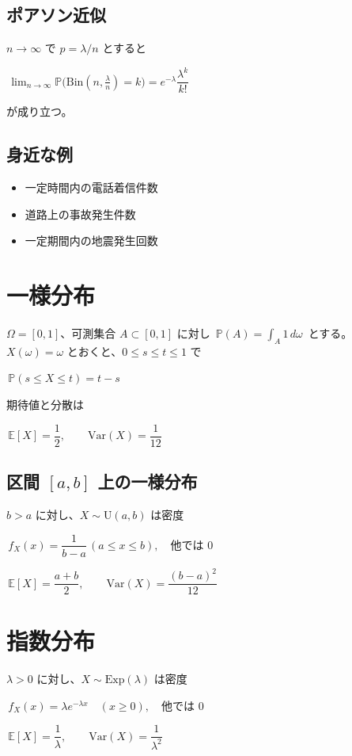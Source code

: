 \documentclass[uplatex,dvipdfmx,11pt,a4paper,openany]{bxjsbook}
\begin{document}
\subsection{ポアソン近似}
$n\to\infty$ で $p=\lambda/n$ とすると

$\,\displaystyle\lim_{n\to\infty}\mathbb{P}\bigl(\mathrm{Bin}(n,\tfrac{\lambda}{n})=k\bigr)=e^{-\lambda}\dfrac{\lambda^k}{k!}\,$

が成り立つ。

\subsection{身近な例}
\begin{itemize}
\item 一定時間内の電話着信件数
\item 道路上の事故発生件数
\item 一定期間内の地震発生回数
\end{itemize}

\section{一様分布}
$\Omega=[0,1]$、可測集合 $A\subset[0,1]$ に対し $\,\mathbb{P}(A)=\int_A 1\,d\omega\,$ とする。$X(\omega)=\omega$ とおくと、$0\le s\le t\le1$ で

$\,\mathbb{P}(s\le X\le t)=t-s\,$

期待値と分散は

$\,\mathbb{E}[X]=\dfrac{1}{2},\qquad \mathrm{Var}(X)=\dfrac{1}{12}\,$

\subsection{区間 $[a,b]$ 上の一様分布}
$b>a$ に対し、$X\sim \mathrm{U}(a,b)$ は密度

$\,f_X(x)=\dfrac{1}{b-a}\,(a\le x\le b),\quad\text{他では }0\,$

$\,\mathbb{E}[X]=\dfrac{a+b}{2},\qquad \mathrm{Var}(X)=\dfrac{(b-a)^2}{12}\,$

\section{指数分布}
$\lambda>0$ に対し、$X\sim\mathrm{Exp}(\lambda)$ は密度

$\,f_X(x)=\lambda e^{-\lambda x}\quad(x\ge0),\quad\text{他では }0\,$

$\,\mathbb{E}[X]=\dfrac{1}{\lambda},\qquad \mathrm{Var}(X)=\dfrac{1}{\lambda^2}\,$
\end{document}
